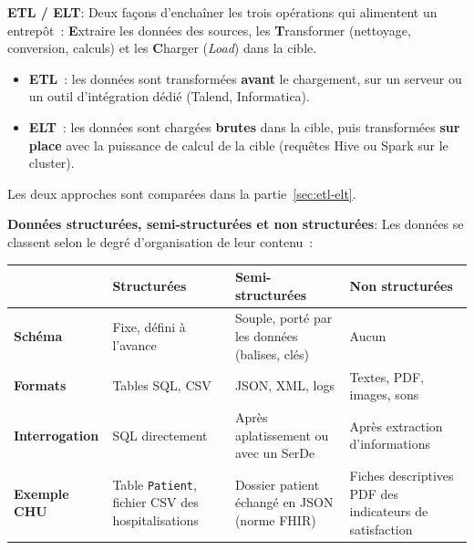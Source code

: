 \separateur

\noindent \textbf{ETL / ELT}:
\noindent Deux façons d'enchaîner les trois opérations qui alimentent un entrepôt~: \textbf{E}xtraire les données des sources, les \textbf{T}ransformer (nettoyage, conversion, calculs) et les \textbf{C}harger (\textit{Load}) dans la cible.
\begin{itemize}
	\item \textbf{ETL}~: les données sont transformées \textbf{avant} le chargement, sur un serveur ou un outil d'intégration dédié (Talend, Informatica).
	\item \textbf{ELT}~: les données sont chargées \textbf{brutes} dans la cible, puis transformées \textbf{sur place} avec la puissance de calcul de la cible (requêtes Hive ou Spark sur le cluster).
\end{itemize}
Les deux approches sont comparées dans la partie~\ref{sec:etl-elt}.

\separateur

\noindent \textbf{Données structurées, semi-structurées et non structurées}:
\noindent Les données se classent selon le degré d'organisation de leur contenu~:

\begin{center}
\begin{tabularx}{\textwidth}{>{\bfseries}l >{\raggedright\arraybackslash}X >{\raggedright\arraybackslash}X >{\raggedright\arraybackslash}X}
\toprule
 & Structurées & Semi-structurées & Non structurées \\
\midrule
Schéma & Fixe, défini à l'avance & Souple, porté par les données (balises, clés) & Aucun \\
Formats & Tables SQL, CSV & JSON, XML, logs & Textes, PDF, images, sons \\
Interrogation & SQL directement & Après aplatissement ou avec un SerDe & Après extraction d'informations \\
Exemple CHU & Table \texttt{Patient}, fichier CSV des hospitalisations & Dossier patient échangé en JSON (norme FHIR) & Fiches descriptives PDF des indicateurs de satisfaction \\
\bottomrule
\end{tabularx}
\end{center}

\separateur

